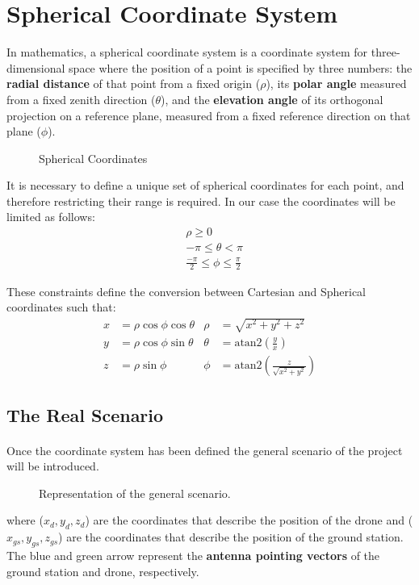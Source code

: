 \section{Spherical Coordinate System}\label{sec:coord}

In mathematics, a spherical coordinate system is a coordinate system for three-dimensional space where the position of a point is specified by three numbers: the \textbf{radial distance} of that point from a fixed origin ($\rho$), its \textbf{polar angle} measured from a fixed zenith direction ($\theta$), and the \textbf{elevation angle} of its orthogonal projection on a reference plane, measured from a fixed reference direction on that plane ($\phi$).

\begin{figure}[H]
   \centering
     
    \label{fig:Spherical1}
    \caption{Spherical Coordinates}
\end{figure}

 It is necessary to define a unique set of spherical coordinates for each point, and therefore restricting their range is required. In our case the coordinates will be limited as follows:
\begin{align*}
& \rho \geq 0 \\
& -\pi \leq \theta < \pi \\
& \frac{-\pi}{2} \leq \phi \leq \frac{\pi}{2}
\label{eq:los_distToHorizon}
\end{align*} 

These constraints define the conversion between Cartesian and Spherical coordinates such that:
\begin{align*}
x &=  \rho\cos\phi\cos\theta	&	\rho &= \sqrt{x^{2} + y^{2} + z^{2}} \\
y &= \rho\cos\phi\sin\theta		&	\theta &= \text{atan2}\left(\frac{y}{x}\right)\\
z &= \rho\sin\phi				&	\phi &=  \text{atan2}\left(\frac{z}{\sqrt{x^2 + y^2}}\right)
\label{eq:los_distToHorizon}
\end{align*} 

\subsection{The Real Scenario}
\paragraph{} Once the coordinate system has been defined the general scenario of the project will be introduced.
\begin{figure}[H]
   \centering
     
    \label{fig:Scenario1}
    \caption{Representation of the general scenario.}
\end{figure}
where ($x_d,y_d,z_d$) are the coordinates that describe the position of the drone and ($x_{gs},y_{gs},z_{gs}$) are the coordinates that describe the position of the ground station.
The blue and green arrow represent the \textbf{antenna pointing vectors} of the ground station and drone, respectively.

